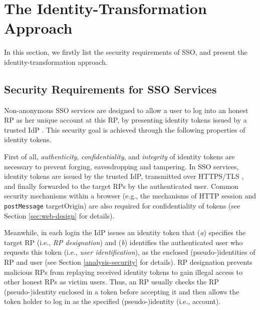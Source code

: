 \section{The Identity-Transformation Approach}
\label{sec:challenge}

In this section,
    we firstly list the security requirements of SSO,
        and present the identity-transformation approach.

\subsection{Security Requirements for SSO Services}
\label{subsec:basicrequirements}

Non-anonymous SSO services are designed to allow a user to log into an honest RP as her unique account at this RP, %
by presenting identity tokens issued by a trusted IdP   \cite{OpenIDConnect,rfc6749,SAML,SAMLIdentifier,NIST2017draft}.
This security goal is achieved through the following properties of identity tokens.

First of all, \emph{authenticity}, \emph{confidentiality}, and \emph{integrity} of identity tokens are necessary to prevent forging, eavesdropping and tampering.
In SSO services, identity tokens are issued by the trusted IdP,
    transmitted over HTTPS/TLS \cite{OpenIDConnect, rfc6749, SAML},
    and finally forwarded to the target RPs by the authenticated user.
Common security mechanisms within a browser (e.g., the mechanisms of HTTP session and \verb+postMessage+ targetOrigin)
are also required for confidentiality of tokens \cite{GoogleIdIntegrate,de2014oauth,FettKS14,BrowserID} (see Section \ref{sec:web-design} for details).

Meanwhile, in each login the IdP issues an identity token that (\emph{a}) specifies the target RP (i.e., \emph{RP designation}) and (\emph{b}) identifies the authenticated user who requests this token (i.e., \emph{user identification}),
        as the enclosed (pseudo-)identities of RP and user \cite{OpenIDConnect,rfc6749,SAML} (see Section \ref{analysis-security} for details).
RP designation prevents malicious RPs from replaying received identity tokens to gain illegal access to other honest RPs as victim users.
Thus, an RP usually checks the RP (pseudo-)identity enclosed in a token before accepting it 
\cite{OpenIDConnect,BrowserID,SPRESSO,NIST2017draft,POIDC,save-flow,up-sso,miso}
 and then allows the token holder to log in as the specified (pseudo-)identity (i.e., account).

